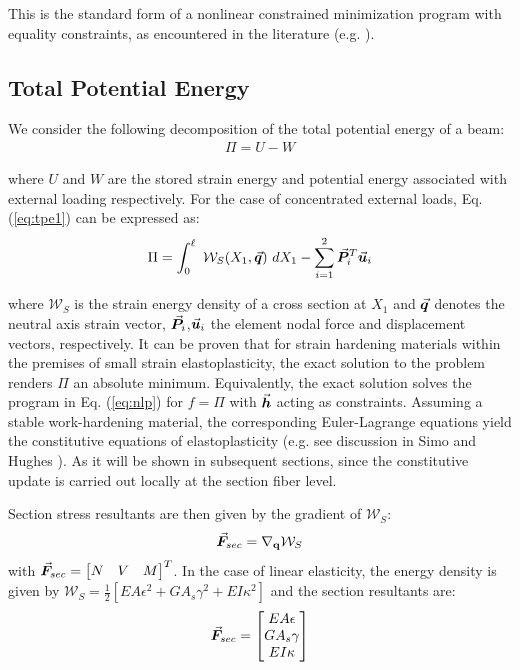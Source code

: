 \noindent This is the standard form of a nonlinear constrained minimization
program with equality constraints, as encountered in the literature (e.g. 
\cite{Luenberger}).

\subsection{Total Potential Energy}\label{subsection:CH2-S3SS2}

We consider the following decomposition of the total potential energy of a beam:
\begin{gather}
	\Pi = U - W
	\label{eq:tpe1}
\end{gather}

\noindent where $U$ and $W$ are the stored strain energy and potential energy
associated with external loading respectively. For the case of concentrated
external loads, Eq. (\ref{eq:tpe1}) can be expressed as:
\begin{gather}
	\Pi = \int_0^\ell\ \mathcal{W}_S(X_1,\vec{\bm{q}})\ dX_1 - 
	\sum_{i=1}^2\vec{\bm{P}}_i^T\vec{\bm{u}}_i
	\label{eq:tpe2}
\end{gather}

\noindent where $\mathcal{W}_S$ is the strain energy density of a cross section
at $X_1$ and $\vec{\bm{q}}$ denotes the neutral axis strain vector, 
$\vec{\bm{P}}_i$,$\vec{\bm{u}}_i$ the element nodal force and
displacement vectors, respectively. It can be proven\cite{Washizu} that for 
strain hardening materials
within the premises of small strain elastoplasticity, the exact solution to the 
problem renders $\Pi$ an absolute minimum.
Equivalently, the exact solution solves the program
in Eq. (\ref{eq:nlp}) for $f=\Pi$ with $\vec{\bm{h}}$ acting as constraints.
Assuming a stable
work-hardening material, the corresponding Euler-Lagrange equations yield the
constitutive equations of elastoplasticity (e.g. see discussion in Simo and 
Hughes
\cite{SimoHughes}). As it will be shown in subsequent sections, since the
constitutive update is carried out locally at the section fiber level.

Section stress
resultants are then given by the gradient of $\mathcal{W}_S$:
\begin{gather}
	\vec{\bm{F}}_{sec} = \nabla_{\mathbf{q}} \mathcal{W}_S
\end{gather}
with $\vec{\bm{F}}_{sec} = \begin{bmatrix} N & V & M \end{bmatrix}^T$.
\noindent In the case of linear elasticity, the energy density is
given by $\mathcal{W}_S = \frac{1}{2}[ EA\epsilon^2 + GA_s\gamma^2 +
EI\kappa^2]$  and the section resultants are:
\begin{gather*}
	\vec{\bm{F}}_{sec} = \begin{bmatrix}
		EA\epsilon\\
		GA_s\gamma\\
		EI\kappa
	\end{bmatrix}
\end{gather*}

